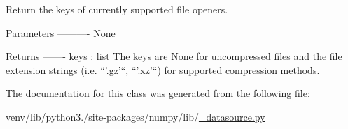 \begin{DoxyVerb}Return the keys of currently supported file openers.

Parameters
----------
None

Returns
-------
keys : list
    The keys are None for uncompressed files and the file extension
    strings (i.e. ``'.gz'``, ``'.xz'``) for supported compression
    methods.\end{DoxyVerb}
 

The documentation for this class was generated from the following file\+:\begin{DoxyCompactItemize}
\item 
venv/lib/python3./site-\/packages/numpy/lib/\hyperlink{__datasource_8py}{\+\_\+datasource.\+py}\end{DoxyCompactItemize}
